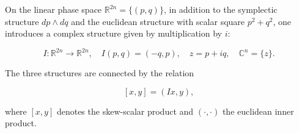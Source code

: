 On the linear phase space $\mathbb{R}^{2n} = \{(p, q)\}$, in addition to the symplectic structure $dp \wedge dq$ and the euclidean structure with scalar square $p^2 + q^2$, one introduces a complex structure given by multiplication by $i$:

$$I: \mathbb{R}^{2n} \rightarrow \mathbb{R}^{2n}, \quad I(p, q) = (-q, p), \quad z = p + iq, \quad \mathbb{C}^n = \{z\}.$$

The three structures are connected by the relation

$$[x, y] = (Ix, y),$$

where $[x, y]$ denotes the skew-scalar product and $(\cdot, \cdot)$ the euclidean inner product.
